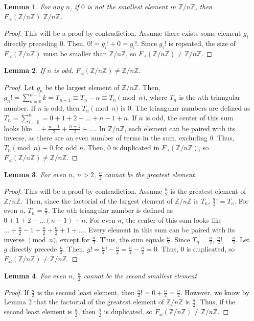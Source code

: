 \documentclass{article}
\newcommand{\ZZ}{\mathbb{Z}}
\newcommand{\ZnZ}{\ZZ/n\ZZ}
\newcommand{\FZ}{F_{\preceq}\left(\ZZ/n\ZZ\right)}
\newtheorem{lemma}{Lemma}
\begin{document}
\begin{lemma}
For any $n$, if $0$ is not the smallest element in $\ZnZ$, then $\FZ$ \neq $\ZnZ$. 
\end{lemma}
\begin{proof}
This will be a proof by contradiction. Assume there exists some element $g_i$ directly preceding 0. Then, $0! = g_i! + 0 = g_i!$. Since $g_i!$ is repeated, the size of $\FZ$ must be smaller than $\ZnZ$, so $\FZ \neq \ZnZ$. 
\end{proof}
\begin{lemma}
If $n$ is odd, $\FZ \neq \ZnZ$. 
\end{lemma}
\begin{proof}
Let $g_n$ be the largest element of $\ZnZ$. Then, $g_n! = \sum_{k=0}^{n-1} k = T_{n-1} \equiv T_n - n \equiv T_n \pmod{n}$, where $T_n$ is the $n$th triangular number. If $n$ is odd, then $T_n \pmod{n}$ is 0. The triangular numbers are defined as $T_n = \sum_{i=0}^{n} = 0 + 1 + 2 + \ldots + n-1 + n$. If $n$ is odd, the center of this sum looks like $\ldots + \frac{n-1}{2} + \frac{n+1}{2} + \ldots$. In $\ZnZ$, each element can be paired with its inverse, as there are an even number of terms in the sum, excluding 0. Thus, $T_n \pmod{n} \equiv 0$ for odd $n$. Then, 0 is duplicated in $\FZ$, so $\FZ \neq \ZnZ$.
\end{proof} 
\begin{lemma}
For even $n$, $n>2$, $\frac{n}{2}$ cannot be the greatest element.
\end{lemma}
\begin{proof}
This will be a proof by contradiction. Assume $\frac{n}{2}$ is the greatest element of $\ZnZ$. Then, since the factorial of the largest element of $\ZnZ$ is $T_n$, $\frac{n}{2}! = T_n$. For even $n$, $T_n = \frac{n}{2}$. The $n$th triangular number is defined as $0 + 1 + 2 + \ldots (n-1) + n$. For even $n$, the center of this sum looks like $\ldots + \frac{n}{2}-1 + \frac{n}{2} + \frac{n}{2}+1 + \ldots$. Every element in this sum can be paired with its inverse $\pmod{n}$, except for $\frac{n}{2}$. Thus, the sum equals $\frac{n}{2}$. Since $T_n = \frac{n}{2}$, $\frac{n}{2}! = \frac{n}{2}$. Let $g$ directly precede $\frac{n}{2}$. Then, $g! = \frac{n}{2}! - \frac{n}{2} = \frac{n}{2}-\frac{n}{2} = 0$. Thus, 0 is duplicated, so $\FZ \neq \ZnZ$. 
\end{proof}
\begin{lemma}
For even $n$, $\frac{n}{2}$ cannot be the second smallest element.
\end{lemma}
\begin{proof}
If $\frac{n}{2}$ is the second least element, then $\frac{n}{2}! = 0 + \frac{n}{2} = \frac{n}{2}$. However, we know by Lemma 2 that the factorial of the greatest element of $\ZnZ$ is $\frac{n}{2}$. Thus, if the second least element is $\frac{n}{2}$, then $\frac{n}{2}$ is duplicated, so $\FZ \neq \ZnZ$.
\end{proof}
\end{document}
